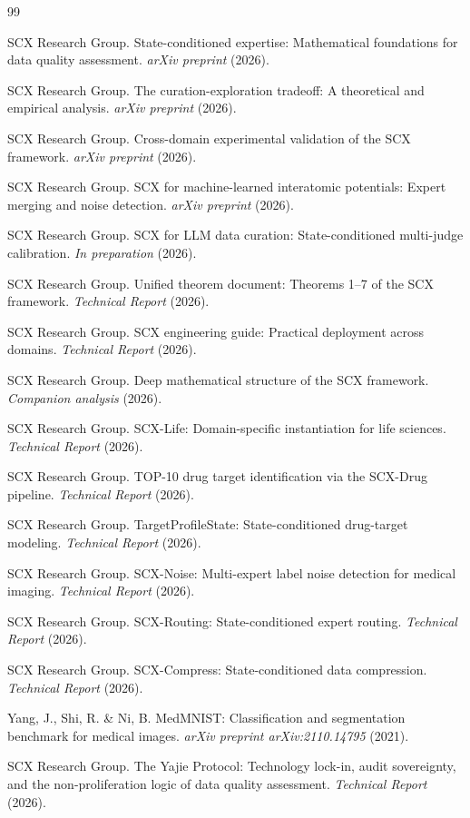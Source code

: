 \documentclass[twocolumn]{article}
\theoremstyle{definition}
\begin{document}
\begin{thebibliography}{99}

SCX Research Group. State-conditioned expertise: Mathematical foundations for data quality assessment. \emph{arXiv preprint} (2026).

SCX Research Group. The curation-exploration tradeoff: A theoretical and empirical analysis. \emph{arXiv preprint} (2026).

SCX Research Group. Cross-domain experimental validation of the SCX framework. \emph{arXiv preprint} (2026).

SCX Research Group. SCX for machine-learned interatomic potentials: Expert merging and noise detection. \emph{arXiv preprint} (2026).

SCX Research Group. SCX for LLM data curation: State-conditioned multi-judge calibration. \emph{In preparation} (2026).

SCX Research Group. Unified theorem document: Theorems 1--7 of the SCX framework. \emph{Technical Report} (2026).

SCX Research Group. SCX engineering guide: Practical deployment across domains. \emph{Technical Report} (2026).

SCX Research Group. Deep mathematical structure of the SCX framework. \emph{Companion analysis} (2026).

SCX Research Group. SCX-Life: Domain-specific instantiation for life sciences. \emph{Technical Report} (2026).

SCX Research Group. TOP-10 drug target identification via the SCX-Drug pipeline. \emph{Technical Report} (2026).

SCX Research Group. TargetProfileState: State-conditioned drug-target modeling. \emph{Technical Report} (2026).

SCX Research Group. SCX-Noise: Multi-expert label noise detection for medical imaging. \emph{Technical Report} (2026).

SCX Research Group. SCX-Routing: State-conditioned expert routing. \emph{Technical Report} (2026).

SCX Research Group. SCX-Compress: State-conditioned data compression. \emph{Technical Report} (2026).

Yang, J., Shi, R. \& Ni, B. MedMNIST: Classification and segmentation benchmark for medical images. \emph{arXiv preprint arXiv:2110.14795} (2021).

SCX Research Group. The Yajie Protocol: Technology lock-in, audit sovereignty, and the non-proliferation logic of data quality assessment. \emph{Technical Report} (2026).

\end{thebibliography}
\end{document}
